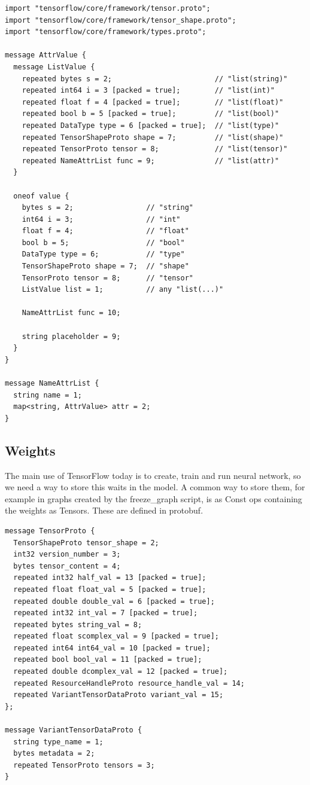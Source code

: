 \documentclass[11pt,openany]{book}
\begin{document}
\begin{verbatim}
import "tensorflow/core/framework/tensor.proto";
import "tensorflow/core/framework/tensor_shape.proto";
import "tensorflow/core/framework/types.proto";

message AttrValue {
  message ListValue {
    repeated bytes s = 2;                        // "list(string)"
    repeated int64 i = 3 [packed = true];        // "list(int)"
    repeated float f = 4 [packed = true];        // "list(float)"
    repeated bool b = 5 [packed = true];         // "list(bool)"
    repeated DataType type = 6 [packed = true];  // "list(type)"
    repeated TensorShapeProto shape = 7;         // "list(shape)"
    repeated TensorProto tensor = 8;             // "list(tensor)"
    repeated NameAttrList func = 9;              // "list(attr)"
  }

  oneof value {
    bytes s = 2;                 // "string"
    int64 i = 3;                 // "int"
    float f = 4;                 // "float"
    bool b = 5;                  // "bool"
    DataType type = 6;           // "type"
    TensorShapeProto shape = 7;  // "shape"
    TensorProto tensor = 8;      // "tensor"
    ListValue list = 1;          // any "list(...)"

    NameAttrList func = 10;

    string placeholder = 9;
  }
}

message NameAttrList {
  string name = 1;
  map<string, AttrValue> attr = 2;
}
\end{verbatim}

\subsection{Weights}

The main use of TensorFlow today is to create, train and run neural network, so we need a way to store this waits in the model. A common way to store them, for example in graphs created by the freeze\_graph script, is as Const ops containing the weights as Tensors. These are defined in protobuf.

\begin{verbatim}
message TensorProto {
  TensorShapeProto tensor_shape = 2;
  int32 version_number = 3;
  bytes tensor_content = 4;
  repeated int32 half_val = 13 [packed = true];
  repeated float float_val = 5 [packed = true];
  repeated double double_val = 6 [packed = true];
  repeated int32 int_val = 7 [packed = true];
  repeated bytes string_val = 8;
  repeated float scomplex_val = 9 [packed = true];
  repeated int64 int64_val = 10 [packed = true];
  repeated bool bool_val = 11 [packed = true];
  repeated double dcomplex_val = 12 [packed = true];
  repeated ResourceHandleProto resource_handle_val = 14;
  repeated VariantTensorDataProto variant_val = 15;
};

message VariantTensorDataProto {
  string type_name = 1;
  bytes metadata = 2;
  repeated TensorProto tensors = 3;
}
\end{verbatim}
\end{document}
